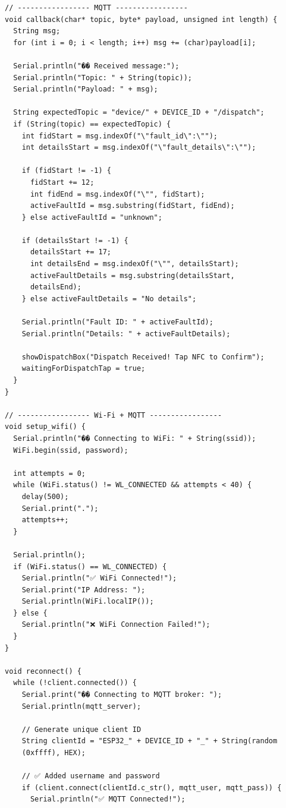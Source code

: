 \begin{lstlisting}
// ----------------- MQTT -----------------
void callback(char* topic, byte* payload, unsigned int length) {
  String msg;
  for (int i = 0; i < length; i++) msg += (char)payload[i];

  Serial.println("�� Received message:");
  Serial.println("Topic: " + String(topic));
  Serial.println("Payload: " + msg);

  String expectedTopic = "device/" + DEVICE_ID + "/dispatch";
  if (String(topic) == expectedTopic) {
    int fidStart = msg.indexOf("\"fault_id\":\"");
    int detailsStart = msg.indexOf("\"fault_details\":\"");

    if (fidStart != -1) {
      fidStart += 12;
      int fidEnd = msg.indexOf("\"", fidStart);
      activeFaultId = msg.substring(fidStart, fidEnd);
    } else activeFaultId = "unknown";

    if (detailsStart != -1) {
      detailsStart += 17;
      int detailsEnd = msg.indexOf("\"", detailsStart);
      activeFaultDetails = msg.substring(detailsStart, 
      detailsEnd);
    } else activeFaultDetails = "No details";

    Serial.println("Fault ID: " + activeFaultId);
    Serial.println("Details: " + activeFaultDetails);

    showDispatchBox("Dispatch Received! Tap NFC to Confirm");
    waitingForDispatchTap = true;
  }
}

// ----------------- Wi-Fi + MQTT -----------------
void setup_wifi() {
  Serial.println("�� Connecting to WiFi: " + String(ssid));
  WiFi.begin(ssid, password);
  
  int attempts = 0;
  while (WiFi.status() != WL_CONNECTED && attempts < 40) {
    delay(500);
    Serial.print(".");
    attempts++;
  }
  
  Serial.println();
  if (WiFi.status() == WL_CONNECTED) {
    Serial.println("✅ WiFi Connected!");
    Serial.print("IP Address: ");
    Serial.println(WiFi.localIP());
  } else {
    Serial.println("❌ WiFi Connection Failed!");
  }
}

void reconnect() {
  while (!client.connected()) {
    Serial.print("�� Connecting to MQTT broker: ");
    Serial.println(mqtt_server);
    
    // Generate unique client ID
    String clientId = "ESP32_" + DEVICE_ID + "_" + String(random
    (0xffff), HEX);
    
    // ✅ Added username and password
    if (client.connect(clientId.c_str(), mqtt_user, mqtt_pass)) {
      Serial.println("✅ MQTT Connected!");
      

\end{lstlisting}
